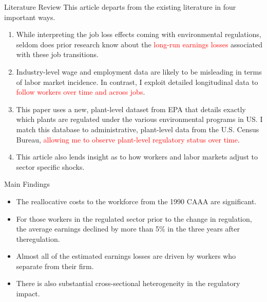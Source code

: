 \documentclass{beamer}
\begin{document}
\begin{frame}{Literature Review}
	This article departs from the existing literature in four important ways.
	\begin{enumerate}
		\item While interpreting the job loss effects coming with environmental regulations, seldom does prior research know about the \textcolor{red}{long-run earnings losses} associated with these job transitions.
		\item Industry-level wage and employment data are likely to be misleading in terms of labor market incidence. In contrast, I exploit detailed longitudinal data to \textcolor{red}{follow workers over time and across jobs}.
		\item This paper uses a new, plant-level dataset from EPA that details exactly which plants are regulated under the various environmental programs in US. I match this database to administrative, plant-level data from the U.S. Census Bureau, \textcolor{red}{allowing me to observe plant-level regulatory status over time}.
		\item This article also lends insight as to how workers and labor markets adjust to sector specific shocks.
	\end{enumerate}
\end{frame}
\begin{frame}{Main Findings}
	\begin{itemize}
		\item The reallocative costs to the workforce from the 1990 CAAA are significant.
		\item For those workers in the regulated sector prior to the change in regulation, the average earnings declined by more than 5\% in the three years after theregulation.
		\item Almost all of the estimated earnings losses are driven by workers who separate from their firm.
		\item There is also substantial cross-sectional heterogeneity in the regulatory impact.
	\end{itemize}
\end{frame}
\end{document}
